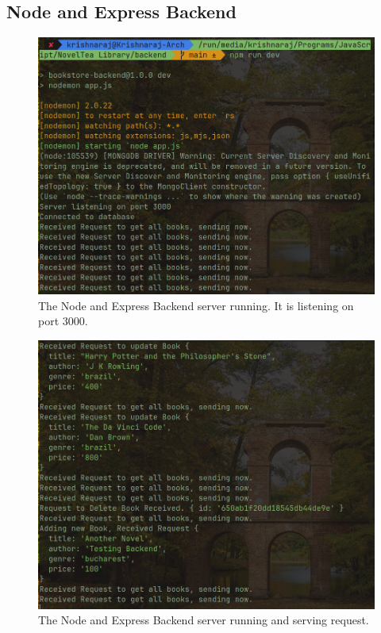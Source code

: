 \documentclass[11pt]{article}
\begin{document}
\subsection{Node and Express Backend}

\begin{figure}[H]
    \centering
    \includegraphics[width=.95\textwidth]{Screenshots/backend 1.png}
    \caption{The Node and Express Backend server running. It is listening on port 3000.}
\end{figure}
\begin{figure}[H]
    \centering
    \includegraphics[width=.95\textwidth]{Screenshots/backend 2.png}
    \caption{The Node and Express Backend server running and serving request. }
\end{figure}
\end{document}
